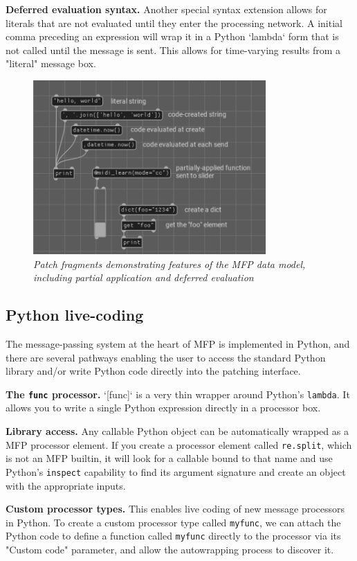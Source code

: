 \documentclass[a4paper]{article}
\begin{document}
{\bf Deferred evaluation syntax.} Another special syntax
extension allows for literals that are not evaluated until they
enter the processing network. A initial comma preceding an
expression will wrap it in a Python `lambda` form that is not
called until the message is sent. This allows for time-varying
results from a "literal" message box.

\begin{figure}[ht]
\centerline{\includegraphics[width=3.5in]{datamodel.png}}
\caption{\label{fig:datamodel}{
    \it Patch fragments demonstrating features of the MFP data model,
    including partial application and deferred evaluation
}}
\end{figure}


\subsection{Python live-coding }

The message-passing system at the heart of MFP is implemented in
Python, and there are several pathways enabling the user to
access the standard Python library and/or write Python code
directly into the patching interface.

{\bf The {\tt func} processor.} `[func]` is a very thin wrapper
around Python's {\tt lambda}. It allows you to write a single
Python expression directly in a processor box.

{\bf Library access.} Any callable Python object can be
automatically wrapped as a MFP processor element. If you create a
processor element called {\tt re.split}, which is not an MFP
builtin, it will look for a callable bound to that name and use
Python's {\tt inspect} capability to find its argument signature
and create an object with the appropriate inputs.

{\bf Custom processor types.} This enables live coding of new
message processors in Python. To create a custom processor type
called {\tt myfunc}, we can attach the Python code to define a
function called {\tt myfunc} directly to the processor via its
"Custom code" parameter, and allow the autowrapping process to
discover it.
\end{document}
